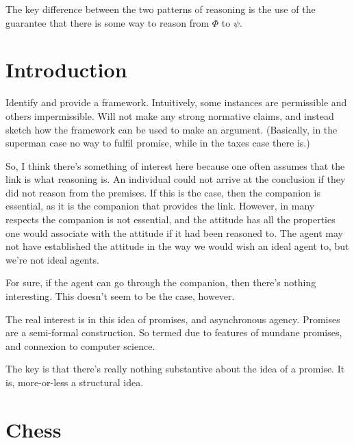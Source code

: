 \documentclass[10pt]{article}
\begin{document}
\begin{note}
  The key difference between the two patterns of reasoning is the use of the guarantee that there is some way to reason from \(\Phi\) to \(\psi\).
\end{note}

\section{Introduction}
\label{sec:introduction}

\begin{note}
  Identify and provide a framework.
  Intuitively, some instances are permissible and others impermissible.
  Will not make any strong normative claims, and instead sketch how the framework can be used to make an argument.
  (Basically, in the superman case no way to fulfil promise, while in the taxes case there is.)
\end{note}


So, I think there's something of interest here because one often assumes that the link is what reasoning is.
An individual could not arrive at the conclusion if they did not reason from the premises.
If this is the case, then the companion is essential, as it is the companion that provides the link.
However, in many respects the companion is not essential, and the attitude has all the properties one would associate with the attitude if it had been reasoned to.
The agent may not have established the attitude in the way we would wish an ideal agent to, but we're not ideal agents.

For sure, if the agent can go through the companion, then there's nothing interesting.
This doesn't seem to be the case, however.

The real interest is in this idea of promises, and asynchronous agency.
Promises are a semi-formal construction.
So termed due to features of mundane promises, and connexion to computer science.

The key is that there's really nothing substantive about the idea of a promise.
It is, more-or-less a structural idea.



\section{Chess}
\label{sec:chess}
\end{document}
